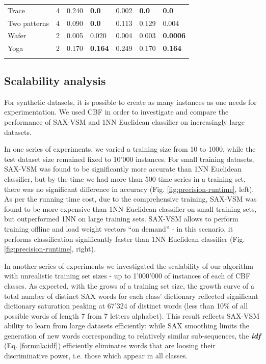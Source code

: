 \documentclass[conference]{IEEEtran}
\begin{document}
\begin{footnotesize}
\begin{table}[t]
\begin{tabularx}{\linewidth}{@{} l *6X @{}}
Trace       &4   & 0.240   & \textbf{0.0}    & 0.002  & \textbf{0.0} & \textbf{0.0} \\
Two patterns &4   & 0.090   & \textbf{0.0}    & 0.113   & 0.129      & 0.004 \\
Wafer        &2    & 0.005   & 0.020     & 0.004  & 0.003 & \textbf{0.0006} \\
Yoga        &2    & 0.170   & \textbf{0.164}  & 0.249 & 0.170 & \textbf{0.164} \\
\hline
\vspace{0.1cm}
\end{tabularx}
\end{table}
\end{footnotesize}

\subsection{Scalability analysis} \label{scalability}
For synthetic datasets, it is possible to create as many instances as one needs for
experimentation.
We used CBF \cite{cbf} in order to investigate and compare the performance of 
SAX-VSM and 1NN Euclidean classifier on increasingly large datasets.

In one series of experiments, we varied a training size from 10 to 1000, while 
the test dataset size remained fixed to 10'000 instances. 
For small training datasets, SAX-VSM was found to be significantly more accurate than 
1NN Euclidean classifier, but by the time we had more than 500 time series in a training set, 
there was no significant difference in accuracy (Fig. \ref{fig:precision-runtime}, left). 
As per the running time cost, due to the comprehensive training, SAX-VSM was found to 
be more expensive than 1NN Euclidean classifier on small training sets, 
but outperformed 1NN on large training sets. SAX-VSM allows to perform training offline and 
load weight vectors ``on demand'' - in this scenario, it performs classification significantly
faster than 1NN Euclidean classifier (Fig. \ref{fig:precision-runtime}, right).

In another series of experiments we investigated the scalability of our algorithm with
unrealistic training set sizes - up to 1'000'000 of instances of each of CBF classes.
As expected, with the grows of a training set size, the growth curve of a total number of 
distinct SAX words for each class' dictionary reflected significant dictionary saturation
peaking at 67'324 of distinct words (less than 10\% of all possible words of length 7
from 7 letters alphabet).
This result reflects SAX-VSM ability to learn from large datasets efficiently: 
while SAX smoothing limits the generation of new words corresponding to 
relatively similar sub-sequences, the \textbf{\textit{idf}} (Eq. \ref{formula:idf})
efficiently eliminates words that are loosing their discriminative power, 
i.e. those which appear in all classes.
\end{document}
